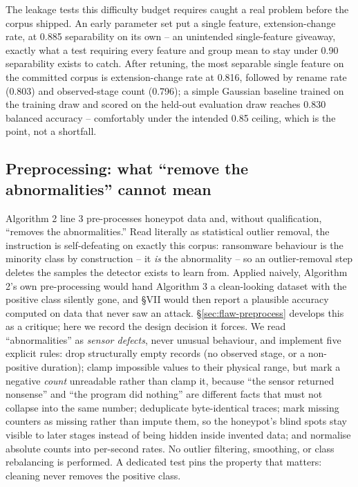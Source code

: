 \documentclass[conference]{IEEEtran}
\begin{document}
The leakage tests this difficulty budget requires caught a real problem before the corpus
shipped. An early parameter set put a single feature, extension-change rate, at 0.885
separability on its own -- an unintended single-feature giveaway, exactly what a test requiring
every feature and group mean to stay under 0.90 separability exists to catch. After retuning,
the most separable single feature on the committed corpus is extension-change rate at 0.816,
followed by rename rate (0.803) and observed-stage count (0.796); a simple Gaussian baseline
trained on the training draw and scored on the held-out evaluation draw reaches 0.830 balanced
accuracy -- comfortably under the intended 0.85 ceiling, which is the point, not a shortfall.

\subsection{Preprocessing: what ``remove the abnormalities'' cannot mean}
\label{sec:preprocessing}

Algorithm 2 line 3 pre-processes honeypot data and, without qualification, ``removes the
abnormalities.'' Read literally as statistical outlier removal, the instruction is
self-defeating on exactly this corpus: ransomware behaviour is the minority class by
construction -- it \emph{is} the abnormality -- so an outlier-removal step deletes the samples
the detector exists to learn from. Applied naively, Algorithm 2's own pre-processing would hand
Algorithm 3 a clean-looking dataset with the positive class silently gone, and \S VII would then
report a plausible accuracy computed on data that never saw an attack. \S\ref{sec:flaw-preprocess}
develops this as a critique; here we record the design decision it forces. We read
``abnormalities'' as \emph{sensor defects}, never unusual behaviour, and implement five explicit
rules: drop structurally empty records (no observed stage, or a non-positive duration); clamp
impossible values to their physical range, but mark a negative \emph{count} unreadable rather
than clamp it, because ``the sensor returned nonsense'' and ``the program did nothing'' are
different facts that must not collapse into the same number; deduplicate byte-identical traces;
mark missing counters as missing rather than impute them, so the honeypot's blind spots stay
visible to later stages instead of being hidden inside invented data; and normalise absolute
counts into per-second rates. No outlier filtering, smoothing, or class rebalancing is performed.
A dedicated test pins the property that matters: cleaning never removes the positive class.
\end{document}
